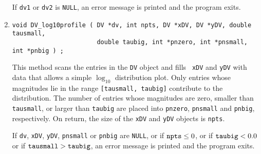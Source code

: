 \begin{enumerate}
\par {}
If {\tt dv1} or {\tt dv2} is {\tt NULL},
an error message is printed and the program exits.
\item
\begin{verbatim}
void DV_log10profile ( DV *dv, int npts, DV *xDV, DV *yDV, double tausmall, 
                       double taubig, int *pnzero, int *pnsmall, int *pnbig ) ;
\end{verbatim}
This method scans the entries in the {\tt DV} object and fills {\tt
xDV} and {\tt yDV} with data that allows a simple $\log_{10}$ 
distribution plot.
Only entries whose magnitudes lie in the range {\tt [tausmall, taubig]}
contribute to the distribution.
The number of entries whose magnitudes are zero, 
smaller than {\tt tausmall},
or larger than {\tt taubig} 
are placed into {\tt pnzero}, {\tt *pnsmall} and {\tt *pnbig},
respectively.
On return, the size of the {\tt xDV} and {\tt yDV} objects 
is {\tt npts}.
\par {}
If {\tt dv}, {\tt xDV}, {\tt yDV}, {\tt pnsmall} or {\tt pnbig} are
{\tt NULL}, or if ${\tt npts} \le 0$, 
or if ${\tt taubig} < 0.0$
or if ${\tt tausmall} > {\tt taubig}$,
an error message is printed and the program exits.
\end{enumerate}
\par
